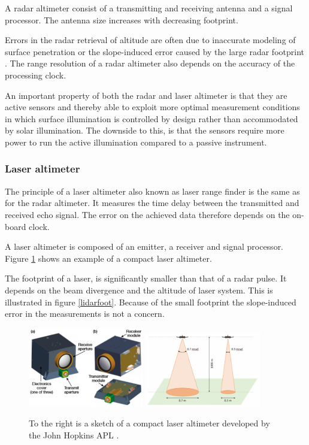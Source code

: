 A radar altimeter consist of a transmitting and receiving antenna and a signal processor. The antenna size increases with decreasing footprint.

Errors in the radar retrieval of altitude are often due to inaccurate modeling
of surface penetration or the slope-induced error caused by
the large radar footprint \cite{icealti}. The range resolution of a radar altimeter also depends on the accuracy of the processing clock.

An important property of both the radar and laser altimeter is that they are active sensors and thereby able to exploit more optimal measurement conditions in which surface illumination is controlled by design rather than accommodated by  solar illumination. The downside to this, is that the sensors require more power to run the active illumination compared to a passive instrument. 

\subsubsection{Laser altimeter}

The principle of a laser altimeter also known as laser range finder is the same as for the radar altimeter. It measures the time delay between the transmitted and received echo signal. The error on the achieved data therefore depends on the on-board clock.

A laser altimeter is composed of an emitter, a receiver and signal processor. Figure \ref{alti} shows an example of a compact laser altimeter. 

The footprint of a laser, is significantly smaller than that of a radar pulse. It depends on the beam divergence and the altitude of laser system. This is illustrated in figure \ref{lidarfoot}.  Because of the small footprint the slope-induced error in the measurements is not a concern.

\begin{figure}[H]
\begin{center}
\includegraphics[width=0.45\textwidth]{figures/CLA.eps}
\includegraphics[width=0.45\textwidth]{figures/lidarfoot.eps}
\caption{To the right is a sketch of a compact laser altimeter developed by the John Hopkins APL \cite{APLCLA}. \cite{footprint}}
\label{alti}
\end{center}
\end{figure}

